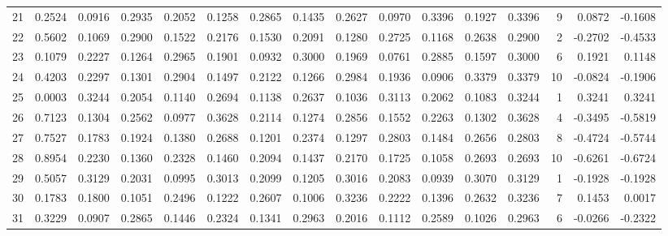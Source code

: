 \begin{tabular}{lrrrrrrrrrrrrrrr}
21  &      0.2524 &  0.0916 &  0.2935 &  0.2052 &  0.1258 &  0.2865 &  0.1435 &  0.2627 &  0.0970 &  0.3396 &   0.1927 &     0.3396 &      9 &                    0.0872 &                    -0.1608 \\
22  &      0.5602 &  0.1069 &  0.2900 &  0.1522 &  0.2176 &  0.1530 &  0.2091 &  0.1280 &  0.2725 &  0.1168 &   0.2638 &     0.2900 &      2 &                   -0.2702 &                    -0.4533 \\
23  &      0.1079 &  0.2227 &  0.1264 &  0.2965 &  0.1901 &  0.0932 &  0.3000 &  0.1969 &  0.0761 &  0.2885 &   0.1597 &     0.3000 &      6 &                    0.1921 &                     0.1148 \\
24  &      0.4203 &  0.2297 &  0.1301 &  0.2904 &  0.1497 &  0.2122 &  0.1266 &  0.2984 &  0.1936 &  0.0906 &   0.3379 &     0.3379 &     10 &                   -0.0824 &                    -0.1906 \\
25  &      0.0003 &  0.3244 &  0.2054 &  0.1140 &  0.2694 &  0.1138 &  0.2637 &  0.1036 &  0.3113 &  0.2062 &   0.1083 &     0.3244 &      1 &                    0.3241 &                     0.3241 \\
26  &      0.7123 &  0.1304 &  0.2562 &  0.0977 &  0.3628 &  0.2114 &  0.1274 &  0.2856 &  0.1552 &  0.2263 &   0.1302 &     0.3628 &      4 &                   -0.3495 &                    -0.5819 \\
27  &      0.7527 &  0.1783 &  0.1924 &  0.1380 &  0.2688 &  0.1201 &  0.2374 &  0.1297 &  0.2803 &  0.1484 &   0.2656 &     0.2803 &      8 &                   -0.4724 &                    -0.5744 \\
28  &      0.8954 &  0.2230 &  0.1360 &  0.2328 &  0.1460 &  0.2094 &  0.1437 &  0.2170 &  0.1725 &  0.1058 &   0.2693 &     0.2693 &     10 &                   -0.6261 &                    -0.6724 \\
29  &      0.5057 &  0.3129 &  0.2031 &  0.0995 &  0.3013 &  0.2099 &  0.1205 &  0.3016 &  0.2083 &  0.0939 &   0.3070 &     0.3129 &      1 &                   -0.1928 &                    -0.1928 \\
30  &      0.1783 &  0.1800 &  0.1051 &  0.2496 &  0.1222 &  0.2607 &  0.1006 &  0.3236 &  0.2222 &  0.1396 &   0.2632 &     0.3236 &      7 &                    0.1453 &                     0.0017 \\
31  &      0.3229 &  0.0907 &  0.2865 &  0.1446 &  0.2324 &  0.1341 &  0.2963 &  0.2016 &  0.1112 &  0.2589 &   0.1026 &     0.2963 &      6 &                   -0.0266 &                    -0.2322 \\

\end{tabular}
